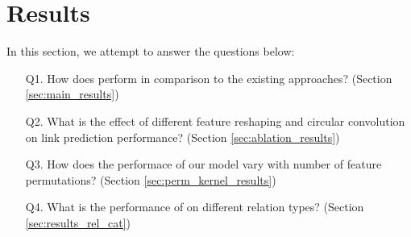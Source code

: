 \documentclass[11pt,a4paper]{article}
\begin{document}
 
\begin{table}[t]
	\centering
	\caption{\label{table:datasets}Details of the datasets used. Please see Section \ref{sec:datasets} for more details.}
\end{table}


\section{Results}
\label{sec:results}


In this section, we attempt to answer the questions below:
\begin{itemize}[itemsep=1pt,topsep=2pt,parsep=0pt,partopsep=0pt,leftmargin=20pt]
	\item[Q1.] How does \method{} perform in comparison to the existing approaches? (Section \ref{sec:main_results})
	\item[Q2.] What is the effect of different feature reshaping and circular convolution on link prediction performance? (Section \ref{sec:ablation_results})
	\item[Q3.] How does the performace of our model vary with number of feature permutations? (Section \ref{sec:perm_kernel_results})
	\item[Q4.] What is the performance of \method{} on different relation types? (Section \ref{sec:results_rel_cat})
\end{itemize}
\end{document}
